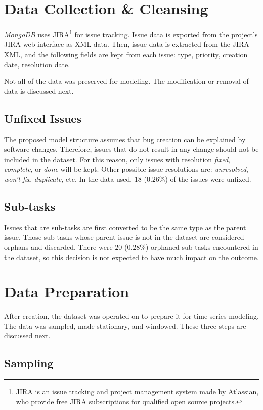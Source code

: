 \documentclass[letterpaper]{report}
\begin{document}
\section*{Data Collection \& Cleansing}
\textit{MongoDB} uses \href{https://www.atlassian.com/software/jira}{JIRA}\footnote{JIRA is an issue tracking and project management system made by \href{https://www.atlassian.com/}{Atlassian}, who provide free JIRA subscriptions for qualified open source projects.} for issue tracking. Issue data is exported from the project's JIRA web interface as XML data. Then, issue data is extracted from the JIRA XML, and the following fields are kept from each issue: type, priority, creation date, resolution date.

Not all of the data was preserved for modeling. The modification or removal of data is discussed next.

\subsection*{Unfixed Issues}
The proposed model structure assumes that bug creation can be explained by software changes. Therefore, issues that do not result in any change should not be included in the dataset. For this reason, only issues with resolution \textit{fixed}, \textit{complete}, or \textit{done} will be kept. Other possible issue resolutions are: \textit{unresolved}, \textit{won't fix}, \textit{duplicate}, etc. In the data used, $18$ ($0.26\%$) of the issues were unfixed. 

\subsection*{Sub-tasks}
Issues that are sub-tasks are first converted to be the same type as the parent issue. Those sub-tasks whose parent issue is not in the dataset are considered orphans and discarded. There were $20$ ($0.28\%$) orphaned sub-tasks encountered in the dataset, so this decision is not expected to have much impact on the outcome.

\section*{Data Preparation}
After creation, the dataset was operated on to prepare it for time series modeling. The data was sampled, made stationary, and windowed. These three steps are discussed next.

\subsection*{Sampling}
\end{document}
